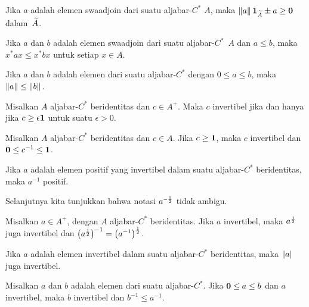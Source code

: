 \begin{prop}\label{0018203} Jika $a$ adalah elemen swaadjoin dari suatu aljabar-$C^*$ $A$, maka
$\lVert a\rVert\,\mathbf{1}_{\widetilde{A}} \pm a \ge \mathbf{0}$ dalam~$\widetilde{A}$.
\end{prop}

\begin{prop}\label{0018204} Jika $a$ dan $b$ adalah elemen swaadjoin dari suatu
aljabar-$C^*$~$A$ dan $a \le b$, maka $x^*ax \le x^*bx$ untuk setiap $x \in A$.
\end{prop}

\begin{prop} Jika $a$ dan $b$ adalah elemen dari suatu aljabar-$C^*$ dengan $0 \le a \le b$, maka
$\lVert a\rVert \le \lVert b\rVert$.
\end{prop}

\begin{prop}\label{0018301} Misalkan $A$ aljabar-$C^*$ beridentitas dan $c \in A^+$. Maka
$c$ invertibel jika dan hanya jika $c \ge \epsilon\mathbf{1}$ untuk suatu $\epsilon > 0$.
\end{prop}

\begin{prop} Misalkan $A$ aljabar-$C^*$ beridentitas dan $c \in A$. Jika $c \ge \mathbf{1}$, maka $c$
invertibel dan $\mathbf{0} \le c^{-1} \le \mathbf{1}$.
\end{prop}

\begin{prop} Jika $a$ adalah elemen positif yang invertibel dalam suatu aljabar-$C^*$ beridentitas, maka $a^{-1}$
positif.
\end{prop}

Selanjutnya kita tunjukkan bahwa notasi $a^{{\scriptscriptstyle{-\frac12}}}$ tidak ambigu.

\begin{prop} Misalkan $a \in A^+$, dengan $A$ aljabar-$C^*$ beridentitas. Jika $a$ invertibel, maka
$a^{{\scriptscriptstyle{\frac12}}}$ juga invertibel dan $\bigl(a^{{\scriptscriptstyle{\frac12}}}\bigr)^{-1} =
\bigl(a^{-1}\bigr)^{{\scriptscriptstyle{\frac12}}}$.
\end{prop}

\begin{cor}\label{00183313} Jika $a$ adalah elemen invertibel dalam suatu aljabar-$C^*$ beridentitas,
maka~$\lvert a\rvert$ juga invertibel.
\end{cor}

\begin{prop}\label{0018401} Misalkan $a$ dan $b$ adalah elemen dari suatu aljabar-$C^*$. Jika
$\mathbf{0} \le a \le b$ dan $a$ invertibel, maka $b$ invertibel dan $b^{-1} \le
a^{-1}$.
\end{prop}

